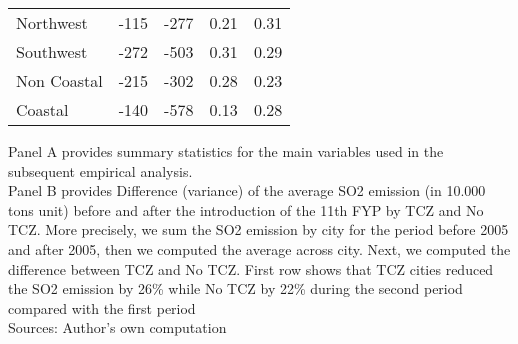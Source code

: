 \documentclass[12pt]{article}
\begin{document}
\begin{table}[!htbp]
\begin{adjustbox}{width=\textwidth, totalheight=\baselineskip,keepaspectratio}
\begin{tabular}{lrrrr}
      Northwest   &    -115 & -277 &     0.21 & 0.31 \\
      Southwest   &    -272 & -503 &     0.31 & 0.29 \\
      Non Coastal &    -215 & -302 &     0.28 & 0.23 \\
      Coastal     &    -140 & -578 &     0.13 & 0.28 \\
      \bottomrule
      \hline
    \end{tabular}
    \end{adjustbox}
    \begin{tablenotes}
      \small
      \item Panel A provides summary statistics for the main variables used in the subsequent empirical analysis. 
      \\
      Panel B provides Difference (variance) of the average SO2 emission (in 10.000 tons unit) before and after the introduction of the 11th FYP by TCZ and No TCZ. More precisely, we sum the SO2 emission by city for the period before 2005 and after 2005, then we computed the average across city. Next, we computed the difference between TCZ and No TCZ. First row shows that TCZ cities reduced the SO2 emission by 26\% while No TCZ by 22\% during the second period compared with the first period
      \\
      Sources: Author's own computation
    \end{tablenotes}
\end{table}

\hfill \break
\end{document}
